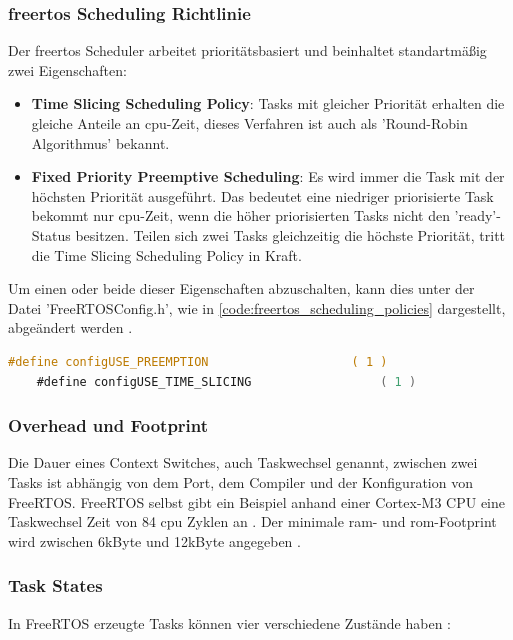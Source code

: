 \documentclass[../EDF Master Thesis.tex]{subfiles}
\begin{document}
\subsubsection{\ac{freertos} Scheduling Richtlinie} \label{section:freertos_scheduling_richtlinie}
Der \ac{freertos} Scheduler arbeitet prioritätsbasiert und beinhaltet standartmäßig zwei Eigenschaften:
\begin{itemize}
    \item \textbf{Time Slicing Scheduling Policy}: Tasks mit gleicher Priorität erhalten die gleiche Anteile an \ac{cpu}-Zeit, dieses Verfahren ist auch als 'Round-Robin Algorithmus' bekannt.
    \item \textbf{Fixed Priority Preemptive Scheduling}: Es wird immer die Task  mit der höchsten Priorität ausgeführt.
                                                         Das bedeutet eine niedriger priorisierte Task bekommt nur \ac{cpu}-Zeit, wenn die höher priorisierten Tasks nicht den 'ready'-Status besitzen.
                                                         Teilen sich zwei Tasks gleichzeitig die höchste Priorität, tritt die Time Slicing Scheduling Policy in Kraft.
\end{itemize}
Um einen oder beide dieser Eigenschaften abzuschalten, kann dies unter der Datei 'FreeRTOSConfig.h', wie in \autoref{code:freertos_scheduling_policies} dargestellt, abgeändert werden \parencite{freertos-scheduling-policy}.
\begin{lstlisting}[language=C, caption=FreeRTOS Scheduling Policy Properties, label=code:freertos_scheduling_policies]
    #define configUSE_PREEMPTION                    ( 1 )
    #define configUSE_TIME_SLICING                  ( 1 )
\end{lstlisting}


\subsubsection{Overhead und Footprint} \label{section:overhead_und_footprint}
Die Dauer eines Context Switches, auch Taskwechsel genannt, zwischen zwei Tasks ist abhängig von dem Port, dem Compiler und der Konfiguration von FreeRTOS.
FreeRTOS selbst gibt ein Beispiel anhand einer Cortex-M3 CPU eine Taskwechsel Zeit von 84 \ac{cpu} Zyklen an \parencite{freertos-overhead}.
Der minimale \ac{ram}- und \ac{rom}-Footprint wird zwischen 6kByte und 12kByte angegeben \parencite{freertos-footprint}.

\subsubsection{Task States} \label{section:task_states}
In FreeRTOS erzeugte Tasks können vier verschiedene Zustände haben \parencite{freertos-task-states}:
\end{document}
